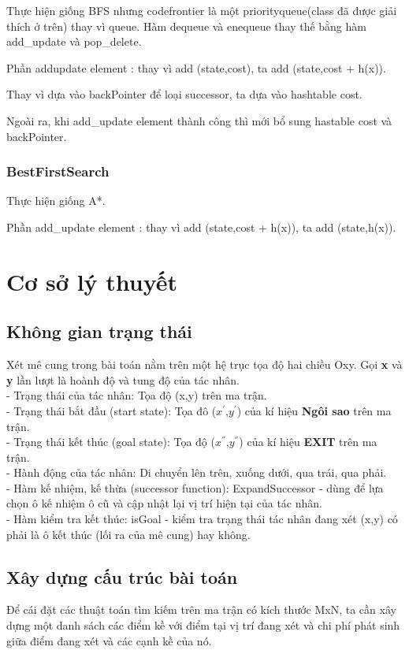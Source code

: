 \documentclass[11pt]{scrartcl} %
\begin{document}
Thực hiện giống BFS nhưng code{frontier} là một priorityqueue(class đã được giải thích ở trên) thay vì queue. Hàm dequeue và enequeue thay thế bằng hàm add\_update và pop\_delete.

Phần addupdate element : thay vì add (state,cost), ta add (state,cost + h(x)).

Thay vì dựa vào backPointer để loại successor, ta dựa vào hashtable cost.

Ngoài ra, khi add\_update element thành công thì mới bổ sung hastable cost và backPointer.



\subsubsection{BestFirstSearch}
Thực hiện giống A*.

Phần add\_update element : thay vì add (state,cost + h(x)), ta add (state,h(x)).

\section{Cơ sở lý thuyết}
\subsection{Không gian trạng thái}
Xét mê cung trong bài toán nằm trên một hệ trục tọa độ hai chiều Oxy. Gọi \textbf{x} và \textbf{y} lần lượt là hoành độ và tung độ của tác nhân.\\
- Trạng thái của tác nhân: Tọa độ (x,y) trên ma trận.\\
- Trạng thái bắt đầu (start state): Tọa đô ($x^{'}$,$y^{'}$) của kí hiệu \textbf{Ngôi sao} trên ma trận.\\
- Trạng thái kết thúc (goal state): Tọa độ ($x^{''}$,$y^{''}$) của kí hiệu \textbf{EXIT} trên ma trận.\\
- Hành động của tác nhân: Di chuyển lên trên, xuống dưới, qua trái, qua phải.\\
- Hàm kế nhiệm, kế thừa (successor function): ExpandSuccessor - dùng để lựa chọn ô kế nhiệm ô cũ và cập nhật lại vị trí hiện tại của tác nhân.\\
- Hàm kiểm tra kết thúc: isGoal - kiểm tra trạng thái tác nhân đang xét (x,y) có phải là ô kết thúc (lối ra của mê cung) hay không.
\subsection{Xây dựng cấu trúc bài toán}
Để cái đặt các thuật toán tìm kiếm trên ma trận có kích thước MxN, ta cần xây dựng một danh sách các điểm kề với điểm tại vị trí đang xét và chi phí phát sinh giữa điểm đang xét và các cạnh kề của nó.\\
\end{document}
